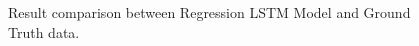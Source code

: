 \begin{figure}[H]
\begin{center}
\end{center}
\decoRule
\caption[Result comparison between Regression LSTM Model and Ground Truth data]{Result comparison between Regression LSTM Model and Ground Truth data.}
\label{fig:regression-lstm-results}
\end{figure}
